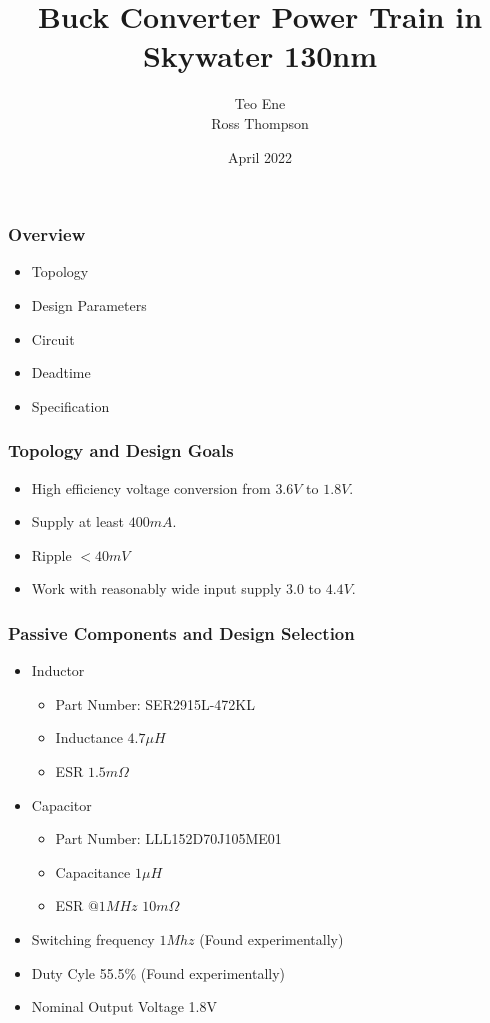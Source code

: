 \documentclass{beamer}
\title{Buck Converter Power Train in Skywater 130nm}
\author{Teo Ene \\
  Ross Thompson}
\institute{Oklahoma State University}
\date{April 2022}
\begin{document}
\frame{\titlepage}

\begin{frame}
  \frametitle{Overview}
  \begin{itemize}
  \item Topology
  \item Design Parameters
  \item Circuit
  \item Deadtime
  \item Specification
  \end{itemize}
\end{frame}

\begin{frame}
  \frametitle{Topology and Design Goals}
  \begin{itemize}
  \item High efficiency voltage conversion from $3.6V$ to $1.8V$.
  \item Supply at least $400mA$.
  \item Ripple $< 40mV$
  \item Work with reasonably wide input supply $3.0$ to $4.4V$.
  \end{itemize}        
\end{frame}

\begin{frame}
  \frametitle{Passive Components and Design Selection}
  \begin{itemize}
  \item Inductor
    \begin{itemize}
    \item Part Number: SER2915L-472KL
    \item Inductance $4.7 \mu H$
    \item ESR $1.5 m\Omega$
    \end{itemize}
  \item Capacitor
    \begin{itemize}
    \item Part Number: LLL152D70J105ME01
    \item Capacitance $1\mu H$
    \item ESR $@ 1MHz$ $10 m\Omega$
    \end{itemize}
  \item Switching frequency $1Mhz$ (Found experimentally)
  \item Duty Cyle 55.5\% (Found experimentally)
  \item Nominal Output Voltage 1.8V 
  \end{itemize}
\end{frame}
\end{document}
